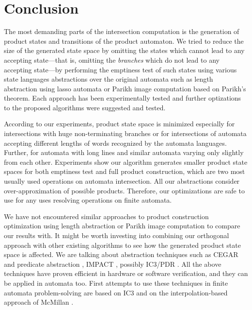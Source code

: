 \chapter{Conclusion}

The most demanding parts of the intersection computation is the generation of product states and transitions of the product automaton. We tried to reduce the size of the generated state space by omitting the states which cannot lead to any accepting state---that is, omitting the \textit{branches} which do not lead to any accepting state---by performing the emptiness test of such states using various state languages abstractions over the original automata such as length abstraction using lasso automata or Parikh image computation based on Parikh's theorem. Each approach has been experimentally tested and further optizations to the proposed algorithms were suggested and tested.

According to our experiments, product state space is minimized especially for intersections with huge non-terminating branches or for intersections of automata accepting different lengths of words recognized by the automata languages. Further, for automata with long lines and similar automata varying only slightly from each other. Experiments show our algorithm generates smaller product state spaces for both emptiness test and full product construction, which are two most usually used operations on automata intersection. All our abstractions consider over-approximation of possible products. Therefore, our optimizations are safe to use for any uses resolving operations on finite automata.

We have not encountered similar approaches to product construction optimization using length abstraction or Parikh image computation to compare our results with. It might be worth investing into combining our orthogonal approach with other existing algorithms to see how the generated product state space is affected. We are talking about abstraction techniques such as CEGAR \cite{DBLP:conf/cav/ClarkeGJLV00} and predicate abstraction \cite{DBLP:conf/cav/ColonU98, DBLP:conf/cav/GrafS97}, IMPACT \cite{DBLP:conf/cav/McMillan06}, possibly IC3/PDR \cite{DBLP:conf/sat/HoderB12, DBLP:conf/fmcad/BradleyM07}. All the above techniques have proven efficient in hardware or software verification, and they can be applied in automata too. First attempts to use these techniques in finite automata problem-solving are based on IC3 \cite{DBLP:journals/pacmpl/HolikJLRV18, DBLP:conf/cav/WangTLYJ16, DBLP:journals/corr/abs-1708-09073} and on the interpolation-based approach of McMillan \cite{DBLP:conf/tacas/AmlaM07, DBLP:conf/tacas/GangeNSSS13}.
